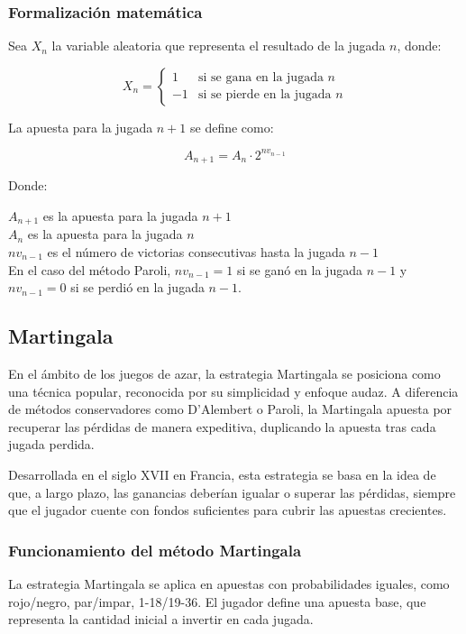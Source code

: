 \documentclass{article}
\begin{document}
\subsubsection{Formalización matemática}

Sea $X_n$ la variable aleatoria que representa el resultado de la jugada $n$, donde:

\[ X_n = \begin{cases} 
1 & \text{si se gana en la jugada } n \\
-1 & \text{si se pierde en la jugada } n 
\end{cases} \]

La apuesta para la jugada $n+1$ se define como:

\[ A_{n+1} = A_n \cdot 2^{nv_{n-1}} \]

Donde:

$A_{n+1}$ es la apuesta para la jugada $n+1$ \\
$A_n$ es la apuesta para la jugada $n$ \\
$nv_{n-1}$ es el número de victorias consecutivas hasta la jugada $n-1$ \\
En el caso del método Paroli, $nv_{n-1} = 1$ si se ganó en la jugada $n-1$ y $nv_{n-1} = 0$ si se perdió en la jugada $n-1$. 

\subsection{Martingala}
En el ámbito de los juegos de azar, la estrategia Martingala se posiciona como una técnica popular, reconocida por su simplicidad y enfoque audaz. A diferencia de métodos conservadores como D'Alembert o Paroli, la Martingala apuesta por recuperar las pérdidas de manera expeditiva, duplicando la apuesta tras cada jugada perdida.

Desarrollada en el siglo XVII en Francia, esta estrategia se basa en la idea de que, a largo plazo, las ganancias deberían igualar o superar las pérdidas, siempre que el jugador cuente con fondos suficientes para cubrir las apuestas crecientes.

\subsubsection{Funcionamiento del método Martingala}

La estrategia Martingala se aplica en apuestas con probabilidades iguales, como rojo/negro, par/impar, 1-18/19-36. El jugador define una apuesta base, que representa la cantidad inicial a invertir en cada jugada.
\end{document}
